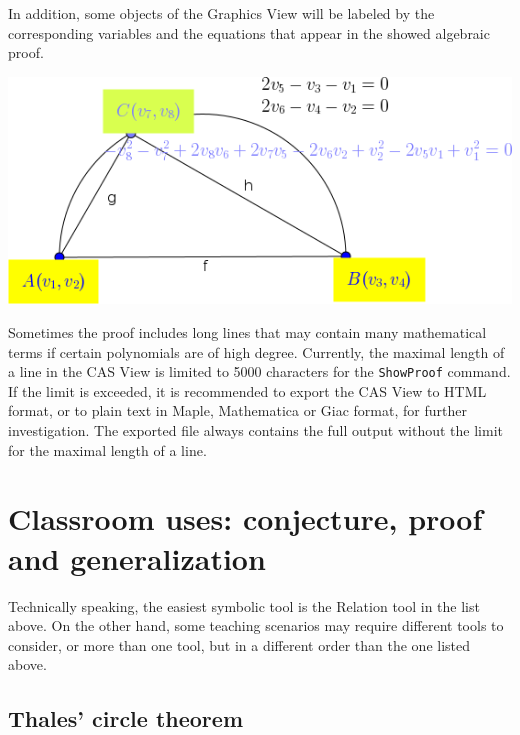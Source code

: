 \documentclass{article}
\begin{document}
\begin{enumerate}
\begin{center}
    \end{center}
    In addition, some objects of the Graphics View will be labeled by the corresponding variables and
    the equations that appear in the showed algebraic proof.
        \begin{center}
    \includegraphics[scale=2]{ShowProof-example}
    \end{center}

\end{enumerate}

Sometimes the proof includes long lines that may contain many mathematical terms if certain polynomials are of high degree. Currently, the maximal length of a line in the CAS View is limited to 5000 characters for the \texttt{ShowProof} command. If the limit is exceeded, it is recommended to export the CAS View to HTML format, or to plain text in Maple, Mathematica or Giac format, for further investigation. The exported file always contains the full output without the limit for the maximal length of a line.

\section{Classroom uses: conjecture, proof and generalization}\label{sec:classroom}

Technically speaking,  the easiest symbolic tool is the Relation tool in the list above. On the other hand, some teaching scenarios may require different tools to consider, or more than one tool, but in a different order than the one listed above.

\subsection{Thales' circle theorem}
\end{document}
